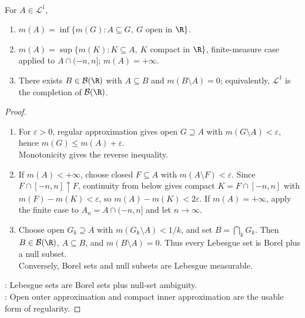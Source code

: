 \begin{corollary} \label{cor:lebesgue-regularity-and-borel-completion-real-line} \\
For $A\in\mathcal{L}^1$,
\begin{enumerate}[label=(\roman*)]
\setlength{\itemsep}{0pt}
\item $m(A)=\inf\{m(G):A\subseteq G,\ G$ open in $\R\}$.
\item $m(A)=\sup\{m(K):K\subseteq A,\ K$ compact in $\R\}$, finite-measure case applied to $A\cap(-n,n]$; $m(A)=+\infty$.
\item There exists $B\in\mathcal{B}(\R)$ with $A\subseteq B$ and $m(B\setminus A)=0$; equivalently, $\mathcal{L}^1$ is the completion of $\mathcal{B}(\R)$.
\end{enumerate}
\begin{proof}
\begin{enumerate}[label=(\roman*)]
\setlength{\itemsep}{0pt}
\item For $\varepsilon>0$, regular approximation gives open $G\supseteq A$ with $m(G\setminus A)<\varepsilon$, hence $m(G)\leq m(A)+\varepsilon$.\\
Monotonicity gives the reverse inequality.
\item If $m(A)<+\infty$, choose closed $F\subseteq A$ with $m(A\setminus F)<\varepsilon$. Since $F\cap[-n,n]\uparrow F$, continuity from below gives compact $K=F\cap[-n,n]$ with $m(F)-m(K)<\varepsilon$, so $m(A)-m(K)<2\varepsilon$. If $m(A)=+\infty$, apply the finite case to $A_n=A\cap(-n,n]$ and let $n\to\infty$.
\item Choose open $G_k\supseteq A$ with $m(G_k\setminus A)<1/k$, and set $B=\bigcap_kG_k$. Then $B\in\mathcal{B}(\R)$, $A\subseteq B$, and $m(B\setminus A)=0$. Thus every Lebesgue set is Borel plus a null subset.\\
Conversely, Borel sets and null subsets are Lebesgue measurable.
\end{enumerate}
: Lebesgue sets are Borel sets plus null-set ambiguity.\\
: Open outer approximation and compact inner approximation are the usable form of regularity.
\end{proof}
\end{corollary}

